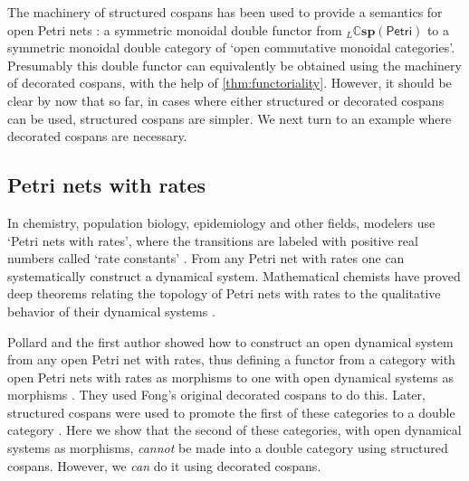 \documentclass[reqno]{amsart}
\theoremstyle{definition}
\theoremstyle{remark}
\newcommand{\Petri}{\mathsf{Petri}}
\newcommand{\double}[1]{\mathbf{\mathbb #1}}
\newcommand{\lCsp}{\double{Csp}}
\begin{document}
The machinery of structured cospans has been used to provide a semantics for open Petri nets \cite{BM}: a symmetric monoidal double functor from ${}_L \lCsp(\Petri)$ to  a symmetric monoidal double category of `open commutative monoidal categories'.  Presumably this double functor can equivalently be obtained using the machinery of decorated cospans, with the help of \cref{thm:functoriality}.  However, it should be clear by now that so far, in cases where either structured or decorated cospans can be used, structured cospans are simpler.   We next turn to an example where decorated cospans are necessary.

\subsection{Petri nets with rates}
\label{subsec:petrirates}

In chemistry, population biology, epidemiology and other fields, modelers use `Petri nets with rates', where the transitions are labeled with positive real numbers called `rate constants' \cite{Haas,Koch,Wilkinson}.   From any Petri net with rates one can systematically construct a dynamical system.  Mathematical chemists have proved deep theorems relating the topology of Petri nets with rates to the qualitative behavior of their dynamical systems \cite{CTF}.

Pollard and the first author showed how to construct an open dynamical system from any open Petri net with rates,  thus defining a functor from a category with open Petri nets with rates as morphisms to one with open dynamical systems as morphisms \cite{BP}.  They used Fong's original decorated cospans to do this.   Later, structured cospans were used to promote the first of these categories to a double category \cite[Section 6.16]{BC}. Here we show that the second of these categories, with open dynamical systems as morphisms, \emph{cannot} be made into a double category using structured cospans.  However, we \emph{can} do it using decorated cospans.
 
\end{document}
